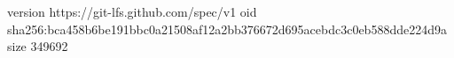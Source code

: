 version https://git-lfs.github.com/spec/v1
oid sha256:bca458b6be191bbc0a21508af12a2bb376672d695acebdc3c0eb588dde224d9a
size 349692
